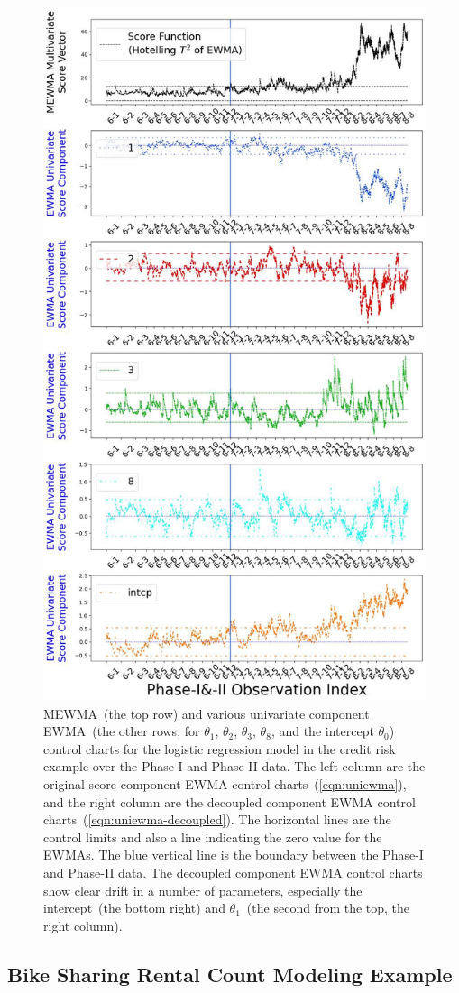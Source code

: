 \documentclass[twoside,11pt]{article}
\begin{document}
\begin{figure}[H]
\includegraphics[width = 0.48\linewidth]{../figures/v14/credit_default/logi_scal_PI_train_sample_weights/Compressed_pos_single_credit_fisher_mlines_with_regu_1e-08_0_0001_0_001_99_0.png}
\caption{
MEWMA~(the top row) and various univariate component EWMA~(the other rows, for $\theta_1$, $\theta_2$, $\theta_3$, $\theta_8$, and the intercept $\theta_0$) control charts for the logistic regression model in the credit risk example over the Phase-I and Phase-II data. The left column are the original score component EWMA control charts~(\ref{eqn:uniewma}), and the right column are the decoupled component EWMA control charts~(\ref{eqn:uniewma-decoupled}). The horizontal lines are the control limits and also a line indicating the zero value for the EWMAs. The blue vertical line is the boundary between the Phase-I and Phase-II data. The decoupled component EWMA control charts show clear drift in a number of parameters, especially the intercept~(the bottom right) and $\theta_1$~(the second from the top, the right column).
}
\label{fig:credit_default_diag}
\end{figure}

\subsection{Bike Sharing Rental Count Modeling Example}
\label{ss:bs_ds}
\end{document}
